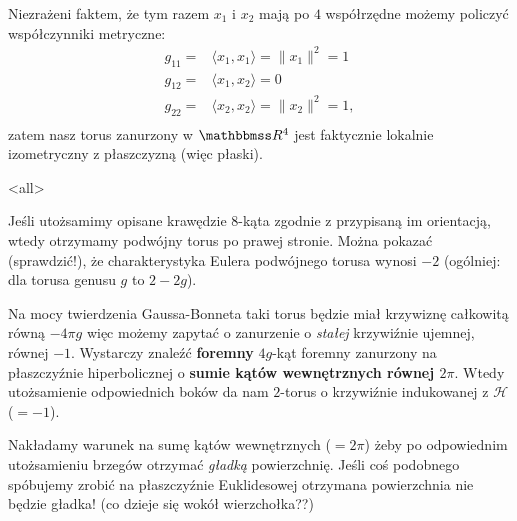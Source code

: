 \begin{frame}
Niezrażeni faktem, że tym razem $x_1$ i $x_2$ mają po $4$ współrzędne możemy policzyć współczynniki metryczne:
\begin{align*}
g_{11}=&\langle x_1,x_1\rangle=\|x_1\|^2=1\\
g_{12}=&\langle x_1,x_2\rangle=0\\
g_{22}=&\langle x_2,x_2\rangle=\|x_2\|^2=1,\\
\end{align*}
\pause zatem nasz torus zanurzony w $\R^4$ jest faktycznie lokalnie izometryczny z płaszczyzną (więc płaski).

\end{frame}
\mode<all>{}

\begin{frame}

Jeśli utożsamimy opisane krawędzie $8$-kąta zgodnie z przypisaną im orientacją, wtedy otrzymamy podwójny torus po prawej stronie. 
\pause Można pokazać (sprawdzić!), że charakterystyka Eulera podwójnego torusa wynosi $-2$ (ogólniej: dla torusa genusu $g$ to $2-2g$).
\end{frame}

\begin{frame}
Na mocy twierdzenia Gaussa-Bonneta taki torus będzie miał krzywiznę całkowitą równą $-4\pi g$ więc możemy zapytać o zanurzenie o \textit{stałej} krzywiźnie ujemnej, równej $-1$. \pause Wystarczy znaleźć \textbf{foremny} $4g$-kąt foremny zanurzony na płaszczyźnie hiperbolicznej o \textbf{sumie kątów wewnętrznych równej $2\pi$}. Wtedy utożsamienie odpowiednich boków da nam $2$-torus o krzywiźnie indukowanej z $\mathcal{H}$ ($=-1$).

\pause \begin{uwaga}
Nakładamy warunek na sumę kątów wewnętrznych ($=2\pi$) żeby po odpowiednim utożsamieniu brzegów otrzymać \textit{gładką} powierzchnię. Jeśli coś podobnego spóbujemy zrobić na płaszczyźnie Euklidesowej otrzymana powierzchnia nie będzie gładka! (co dzieje się wokół wierzchołka??) 
\end{uwaga}
\end{frame}
\begin{frame}

\begin{center}

\end{center}

\end{frame}

